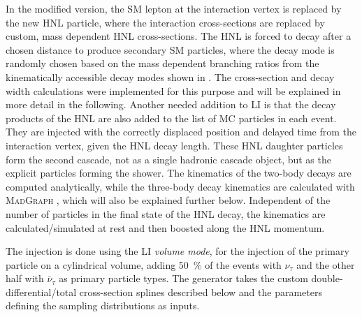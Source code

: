 In the modified version, the SM lepton at the interaction vertex is replaced by the new HNL particle, where the interaction cross-sections are replaced by custom, mass dependent HNL cross-sections. The HNL is forced to decay after a chosen distance to produce secondary SM particles, where the decay mode is randomly chosen based on the mass dependent branching ratios from the kinematically accessible decay modes shown in . The cross-section and decay width calculations were implemented for this purpose and will be explained in more detail in the following. Another needed addition to LI is that the decay products of the HNL are also added to the list of MC particles in each event. They are injected with the correctly displaced position and delayed time from the interaction vertex, given the HNL decay length. These HNL daughter particles form the second cascade, not as a single hadronic cascade object, but as the explicit particles forming the shower. The kinematics of the two-body decays are computed analytically, while the three-body decay kinematics are calculated with \textsc{MadGraph} , which will also be explained further below. Independent of the number of particles in the final state of the HNL decay, the kinematics are calculated/simulated at rest and then boosted along the HNL momentum. 

The injection is done using the LI \textit{volume mode}, for the injection of the primary particle on a cylindrical volume, adding \SI{50}{\percent} of the events with $\nu_\tau$ and the other half with $\bar{\nu}_\tau$ as primary particle types. The generator takes the custom double-differential/total cross-section splines described below and the parameters defining the sampling distributions as inputs.



